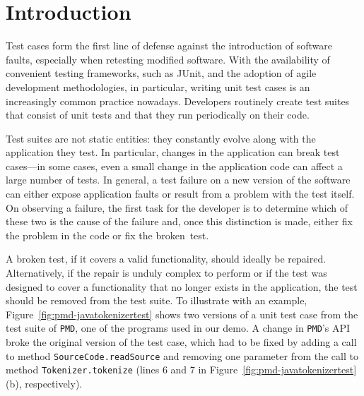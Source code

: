 \documentclass[conference]{IEEEtran}
\newcommand{\lang}[1]{\texttt{\small #1}}
\newcommand{\subject}[1]{\texttt{\small #1}}
\begin{document}



\section{Introduction}
\label{sec:intro}

Test cases form the first line of defense against the introduction of
software faults, especially when retesting modified software.  With
the availability of convenient testing frameworks, such as JUnit, and
the adoption of agile development methodologies, in particular,
writing unit test cases is an increasingly common practice nowadays.
Developers routinely create test suites that consist of unit tests and
that they run periodically on their code.

Test suites are not static entities: they constantly evolve along with
the application they test.  In particular, changes in the application
can break test cases---in some cases, even a small change in the
application code can affect a large number of tests. In general, a
test failure on a new version of the software can either expose
application faults or result from a problem with the test itself.  On
observing a failure, the first task for the developer is to determine
which of these two is the cause of the failure and, once this
distinction is made, either fix the problem in the code or fix the
broken~test.

A broken test, if it covers a valid functionality, should ideally be
repaired. Alternatively, if the repair is unduly complex to perform or
if the test was designed to cover a functionality that no longer
exists in the application, the test should be removed from the test
suite. To illustrate with an example,
Figure~\ref{fig:pmd-javatokenizertest} shows two versions of a unit
test case from the test suite of \subject{PMD}, one of the programs
used in our demo. A change in \subject{PMD}'s API broke the original
version of the test case, which had to be fixed by adding a call to
method \lang{SourceCode.readSource} and removing one parameter from
the call to method \lang{Tokenizer.tokenize} (lines 6 and 7 in
Figure~\ref{fig:pmd-javatokenizertest}(b), respectively).
\end{document}
